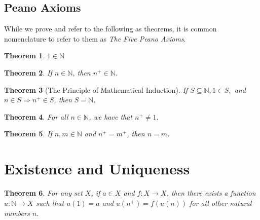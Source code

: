 \documentclass{article}
\theoremstyle{definition}
\theoremstyle{definition}
\theoremstyle{plain}
\theoremstyle{remark}
\theoremstyle{plain}
\newtheorem{theorem}{Theorem}[section]
\theoremstyle{remark}
\theoremstyle{plain}
\theoremstyle{plain}
\theoremstyle{plain}
\begin{document}
\subsection{Peano Axioms}

While we prove and refer to the following as theorems, it is common nomenclature 
to refer to them as \textit{The Five Peano Axioms}.

\begin{theorem}
  \( 1 \in \mathbb{N} \)
  \label{thm:first_peano_axiom}
\end{theorem}

\begin{theorem}
  If \( n \in \mathbb{N} \), then \( n^{+} \in \mathbb{N} \).
  \label{thm:second_peano_axiom}
\end{theorem}

\begin{theorem}[The Principle of Mathematical Induction]
  If \( S \subseteq \mathbb{N}, 1 \in S,\) and 
  \(n \in S \Rightarrow n^{+} \in S\), then \( S = \mathbb{N} \).
  \label{thm:third_peano_axiom}
\end{theorem}

\begin{theorem}
  For all \( n \in \mathbb{N} \), we have that \( n^{+} \neq 1 \). 
  \label{thm:fourth_peano_axiom}
\end{theorem}

\begin{theorem}
  If \( n, m \in \mathbb{N}\) and \( n^{+} = m^{+} \), then \( n = m \).
  \label{thm:fifth_peano_axiom}
\end{theorem}

\section{Existence and Uniqueness}

\begin{theorem}
  For any set \( X \), if \( a \in X \) and \( f : X \rightarrow X \), then 
  there exists a function \( u: \mathbb{N} \rightarrow X \) such that 
  \( u(1) = a \) and \( u(n^{+}) = f(u(n)) \) for all other natural numbers 
  \( n \). 
  \label{recursion}
\end{theorem}
\end{document}
